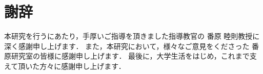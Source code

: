 \chapter*{謝辞}

本研究を行うにあたり，手厚いご指導を頂きました指導教官の
番原 睦則教授に深く感謝申し上げます．
また，本研究において，様々なご意見をくださった
番原研究室の皆様に感謝申し上げます．
最後に，大学生活をはじめ，これまで支えて頂いた方々に感謝申し上げます．

